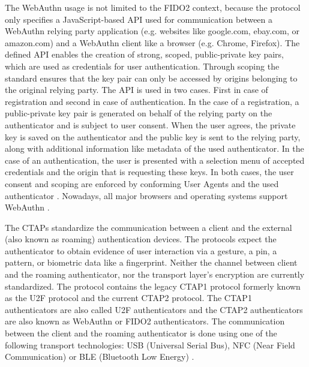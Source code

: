\documentclass[runningheads]{llncs}
\begin{document}
The WebAuthn usage is not limited to the FIDO2 context, because the protocol only specifies a JavaScript-based API used for communication between a WebAuthn relying party application (e.g. websites like google.com, ebay.com, or amazon.com) and a WebAuthn client like a browser (e.g. Chrome, Firefox). The defined API enables the creation of strong, scoped, public-private key pairs, which are used as credentials for user authentication. Through scoping the standard ensures that the key pair can only be accessed by origins belonging to the original relying party. The API is used in two cases. First in case of registration and second in case of authentication. In the case of a registration, a public-private key pair is generated  on behalf of the relying party on the authenticator and is subject to user consent. When the user agrees, the private key is saved on the authenticator and the public key is sent to the relying party, along with additional information like metadata of the used authenticator. In the case of an authentication, the user is presented with a selection menu of accepted credentials and the origin that is requesting these keys. In both cases, the user consent and scoping are enforced by conforming User Agents and the used authenticator \cite{000002}. Nowadays, all major browsers and operating systems support WebAuthn \cite{000001}.

The CTAPs standardize the communication between a client and the external (also known as roaming) authentication devices. The protocols expect the authenticator to obtain evidence of user interaction via a gesture, a pin, a pattern, or biometric data like a fingerprint. Neither the channel between client and the roaming authenticator, nor the transport layer's encryption are currently standardized. The protocol contains the legacy CTAP1 protocol formerly known as the U2F protocol and the current CTAP2 protocol. The CTAP1 authenticators are also called U2F authenticators and the CTAP2 authenticators are also known as WebAuthn or FIDO2 authenticators. The communication between the client and the roaming authenticator is done using one of the following transport technologies: USB (Universal Serial Bus), NFC (Near Field Communication) or BLE (Bluetooth Low Energy) \cite{000003}\cite{274547}\cite{9099190}.
\end{document}
